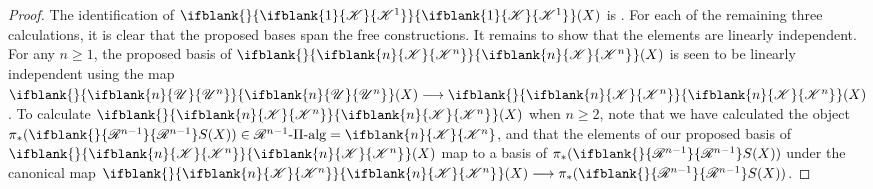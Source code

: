 \documentclass[10pt]{article}
\newcommand{\GS}[1]{\scrE^{#1}}
\newcommand{\RestLie}[1]{\mathsf{r}{\scrL}^{#1}}%
\newcommand{\GoodLie}[1]{\mathsf{g}{\scrL}^{#1}}%
\newcommand{\PRLie}[1]{\scrR^{#1}}%
\newcommand{\LL}[1]{\ifblank{#1}{\scrK}{\scrK^{#1}}}
\newcommand{\GR}[1]{\ifblank{#1}{\scrV}{\scrV^{#1}}}
\newcommand{\nontop}[1]{\ifblank{#1}{\scrU}{\scrU^{#1}}}
\newcommand{\PiAlg}[1]{#1\textup{-$\Pi$-alg}}
\newcommand{\admis}[1]{\mathrm{adm}(#1)}%
\newcommand{\Fr}[2][]{\ifblank{#1}{#2}{#2_{#1}}}
\renewcommand{\Q}{Q}
\begin{document}
\begin{CategoriesOfInterest}
%
\begin{proof}
The identification of $\Fr{\LL{1}}(X)$ is \cite[Thm F, p.15]{MR1089001}.
For each of the remaining three calculations, it is clear that the proposed bases span the free constructions. It remains to show that the elements are linearly independent.
For any $n\geq1$, the proposed basis of $\Fr{\LL{n}}(X)$ is seen to be linearly independent using the map $\Fr{\nontop{n}}(X)\to \Fr{\LL{n}}(X)$. To calculate $\Fr{\LL{n}}(X)$ when $n\geq2$, note that we have calculated the object $\pi_*(\Fr{\PRLie{n-1}}S(X))\in\PiAlg{\PRLie{n-1}}=\LL{n}$, and that the elements of our proposed basis of $\Fr{\LL{n}}(X)$ map to a basis of $\pi_*(\Fr{\PRLie{n-1}}S(X))$ under the canonical map $\Fr{\LL{n}}(X)\to \pi_*(\Fr{\PRLie{n-1}}S(X))$. %

\end{proof}
\end{CategoriesOfInterest}
\end{document}

